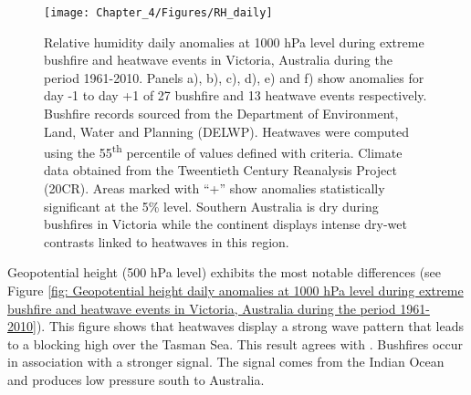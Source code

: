 \begin{figure}[h]
\noindent \begin{centering}
\texttt{[image: Chapter\_4/Figures/RH\_daily]}
\par\end{centering}

\caption[Relative humidity daily anomalies at 1000 hPa level during extreme
bushfire and heatwave events in Victoria, Australia during the period
1961-2010]{Relative humidity daily anomalies at 1000 hPa level during extreme
bushfire and heatwave events in Victoria, Australia during the period
1961-2010. Panels a), b), c), d), e) and f) show anomalies for day
-1 to day +1 of 27 bushfire and 13 heatwave events respectively. Bushfire
records sourced from the Department of Environment, Land, Water and
Planning (DELWP). Heatwaves were computed using the 55\protect\textsuperscript{th}
percentile of values defined with \citet{Nairn2009} criteria. Climate
data obtained from the Tweentieth Century Reanalysis Project (20CR).
Areas marked with ``+'' show anomalies statistically significant
at the 5\% level. Southern Australia is dry during bushfires in Victoria
while the continent displays intense dry-wet contrasts linked to heatwaves
in this region. \label{Relative humidity daily anomalies at 1000 hPa level during extreme bushfire and heatwave events in Victoria, Australia during the period 1961-2010}}
\end{figure}


Geopotential height (500 hPa level) exhibits the most notable differences
(see Figure \ref{fig: Geopotential height daily anomalies at 1000 hPa level during extreme bushfire and heatwave events in Victoria, Australia during the period 1961-2010}).
This figure shows that heatwaves display a strong wave pattern that
leads to a blocking high over the Tasman Sea. This result agrees with
\citet{Pezza2012}. Bushfires occur in association with a stronger
signal. The signal comes from the Indian Ocean and produces low pressure
south to Australia.


